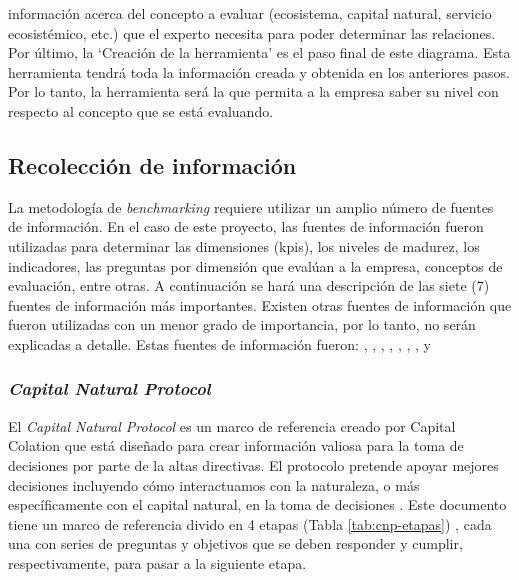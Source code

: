 información acerca del concepto a evaluar (ecosistema, capital natural, servicio ecosistémico, etc.) que el experto necesita para poder determinar las relaciones. Por último, la ‘Creación de la herramienta’ es el paso final de este diagrama. Esta herramienta tendrá toda la información creada y obtenida en los anteriores pasos. Por lo tanto, la herramienta será la que permita a la empresa saber su nivel con respecto al concepto que se está evaluando. 


\subsection{Recolección de información} \label{subsec:recoleccion-informacion}
La metodología de \textit{benchmarking} requiere utilizar un amplio número de fuentes de información. En el caso de este proyecto, las fuentes de información fueron utilizadas para determinar las dimensiones (\acrshort{kpis}), los niveles de madurez, los indicadores, las preguntas por dimensión que evalúan a la empresa, conceptos de evaluación, entre otras. A continuación se hará una descripción de las siete (7) fuentes de información más importantes. Existen otras fuentes de información que fueron utilizadas con un menor grado de importancia, por lo tanto, no serán explicadas a detalle. Estas fuentes de información fueron: \parencite{alliance-for-water-stewardship-2019}, \parencite{gri-2022}, \parencite{iso-1999}, \parencite{pacific-institute-2014}, \parencite{world-business-council-for-sustainable-development-2011}, \parencite{world-resources-institute-2008}, \parencite{world-wildlife-fund-2021}, \parencite{taskforce-on-nature-related-financial-disclosures-2023} y \parencite{climate-disclosure-standards-board-2022}

\subsubsection{\textit{Capital Natural Protocol}}
El \textit{Capital Natural Protocol} es un marco de referencia creado por Capital Colation que está diseñado para crear información valiosa para la toma de decisiones por parte de la altas directivas. El protocolo pretende apoyar mejores decisiones incluyendo cómo interactuamos con la naturaleza, o más específicamente con el capital natural, en la toma de decisiones \textit{\parencite{capitals-coalition-2021}}. Este documento tiene un marco de referencia divido en 4 etapas (Tabla \ref{tab:cnp-etapas}) , cada una con series de preguntas y objetivos que se deben responder y cumplir, respectivamente, para pasar a la siguiente etapa. 



